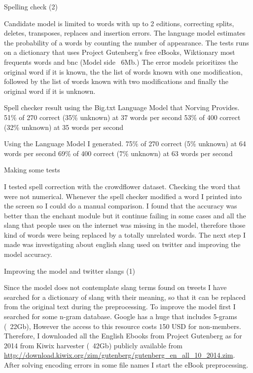 Spelling check (2)

Candidate model is limited to words with up to 2 editions, correcting splits, deletes, transposes, replaces and insertion errors.
The language model estimates the probability of a words by counting the number of appearance. The tests runs on a dictionary that uses Project Gutenberg’s free eBooks, Wiktionary most frequents words\cite{WiktionaryFL} and \acrfull{bnc} \cite{bncFLAdamK} (Model side ~6Mb.)
The error models prioritizes the original word if it is known, the the list of words known with one modification, followed by the list of words known with two modifications and finally the original word if it is unknown.

Spell checker result using the Big.txt Language Model that Norving Provides.
51\% of 270 correct (35\% unknown) at 37 words per second
53\% of 400 correct (32\% unknown) at 35 words per second

Using the Language Model I generated.
75\% of 270 correct (5\% unknown) at 64 words per second 
69\% of 400 correct (7\% unknown) at 63 words per second

Making some tests

I tested spell correction with the crowdflower dataset. Checking the word that were not numerical. Whenever the spell checker modified a word I printed into the screen so I could do a manual comparison.
I found that the accuracy was better than the enchant module but it continue failing in some cases and all the slang that people uses on the internet was missing in the model, therefore those kind of words were being replaced by a totally unrelated words.
The next step I made was investigating about english slang used on twitter and improving the model accuracy.

Improving the model and twitter slangs (1)

Since the model does not contemplate slang terms found on tweets I have searched for a dictionary of slang with their meaning, so that it can be replaced from the original text during the preprocessing.
To improve the model first I searched for some n-gram database. Google has a huge that includes 5-grams (~22Gb), However the access to this resource costs 150 USD for non-members\cite{LDCGoogle5-gram}. Therefore, I downloaded all the English Ebooks from Project Gutenberg as for 2014 from Kiwix harvester\cite{kiwix} (~42Gb) publicly available from \url{http://download.kiwix.org/zim/gutenberg/gutenberg_en_all_10_2014.zim}. After solving encoding errors in some file names I start the eBook preprocessing.

